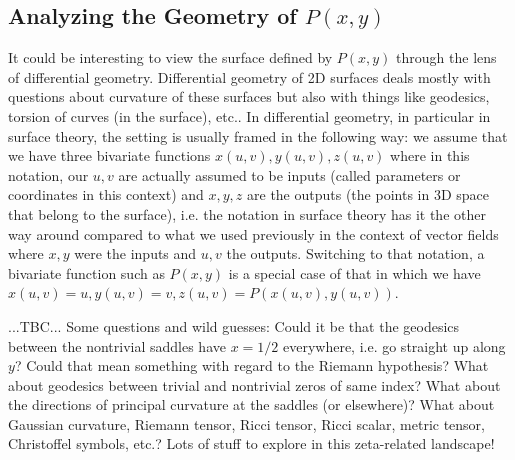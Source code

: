\documentclass[12pt]{article}
\begin{document}
\subsection{Analyzing the Geometry of $P(x,y)$}
It could be interesting to view the surface defined by $P(x,y)$ through the lens of differential geometry. Differential geometry of 2D surfaces deals mostly with questions about curvature of these surfaces but also with things like geodesics, torsion of curves (in the surface), etc.. In differential geometry, in particular in surface theory, the setting is usually framed in the following way: we assume that we have three bivariate functions $x(u,v), y(u,v), z(u,v)$ where in this notation, our $u,v$ are actually assumed to be inputs (called parameters or coordinates in this context) and $x,y,z$ are the outputs (the points in 3D space that belong to the surface), i.e. the notation in surface theory has it the other way around compared to what we used previously in the context of vector fields where $x,y$ were the inputs and $u,v$ the outputs. Switching to that notation, a bivariate function such as $P(x,y)$ is a special case of that in which we have $x(u,v) = u, y(u,v) = v, z(u,v) = P(x(u,v),y(u,v))$.

...TBC... Some questions and wild guesses: Could it be that the geodesics between the nontrivial saddles have $x=1/2$ everywhere, i.e. go straight up along $y$? Could that mean something with regard to the Riemann hypothesis? What about geodesics between trivial and nontrivial zeros of same index? What about the directions of principal curvature at the saddles (or elsewhere)? What about Gaussian curvature, Riemann tensor, Ricci tensor, Ricci scalar, metric tensor, Christoffel symbols, etc.? Lots of stuff to explore in this zeta-related landscape!
\end{document}
